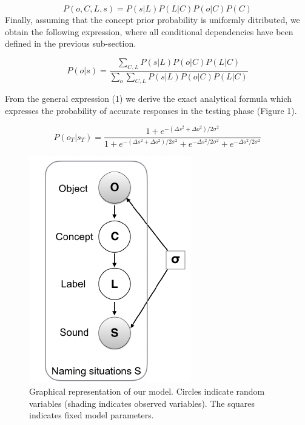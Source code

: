 \documentclass[10pt, letterpaper]{article}
\newenvironment{CodeChunk}{}{}
\begin{document}
\[P(o,C,L,s) = P(s|L)P(L|C)P(o|C)P(C) \] Finally, assuming that the
concept prior probability is uniformly ditributed, we obtain the
following expression, where all conditional dependencies have been
defined in the previous sub-section.

\begin{equation}
P(o|s) = \frac{\sum_{C,L} P(s|L)P(o|C)P(L|C)}{\sum_{o} \sum_{C,L} P(s|L)P(o|C)P(L|C)}
\end{equation}

From the general expression (1) we derive the exact analytical formula
which expresses the probability of accurate responses in the testing
phase (Figure 1).

\begin{equation}
P(o_T|s_T)= \frac{1 + e^{-(\Delta s^2 + \Delta o^2) /2\sigma^2}}{1 + e^{-(\Delta s^2 + \Delta o^2) /2\sigma^2} + e^{-\Delta s^2 /2\sigma^2} + e^{-\Delta o^2 /2\sigma^2 }}
\end{equation}

\begin{CodeChunk}
\begin{figure}[h]

{\centering \includegraphics{figs/model-1} 

}

\caption{\label{fig:model}Graphical representation of our model. Circles indicate random variables (shading indicates observed variables). The squares indicates fixed model parameters.}\label{fig:model}
\end{figure}
\end{CodeChunk}
\end{document}
